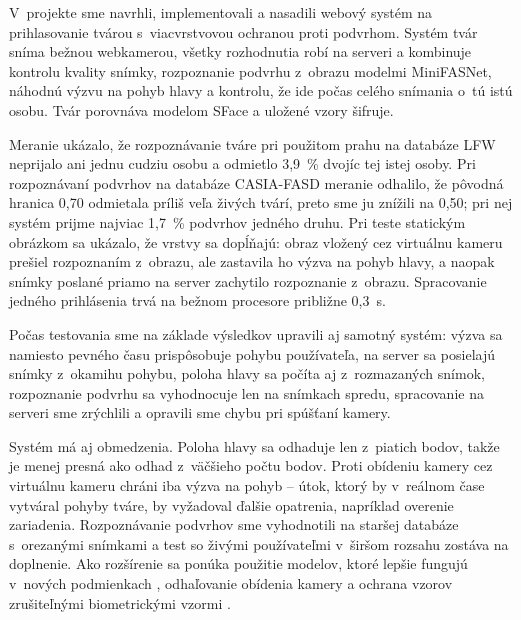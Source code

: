 \documentclass[12pt,a4paper,oneside]{report}
\begin{document}
V~projekte sme navrhli, implementovali a nasadili webový systém na prihlasovanie tvárou
s~viacvrstvovou ochranou proti podvrhom. Systém tvár sníma bežnou webkamerou, všetky
rozhodnutia robí na serveri a kombinuje kontrolu kvality snímky, rozpoznanie podvrhu
z~obrazu modelmi MiniFASNet, náhodnú výzvu na pohyb hlavy a kontrolu, že ide počas
celého snímania o~tú istú osobu. Tvár porovnáva modelom SFace a uložené vzory šifruje.

Meranie ukázalo, že rozpoznávanie tváre pri použitom prahu na databáze LFW neprijalo ani
jednu cudziu osobu a odmietlo 3,9~\% dvojíc tej istej osoby. Pri rozpoznávaní podvrhov
na databáze CASIA-FASD meranie odhalilo, že pôvodná hranica 0,70 odmietala príliš veľa
živých tvárí, preto sme ju znížili na 0,50; pri nej systém prijme najviac 1,7~\% podvrhov
jedného druhu. Pri teste statickým obrázkom sa ukázalo, že vrstvy sa dopĺňajú: obraz
vložený cez virtuálnu kameru prešiel rozpoznaním z~obrazu, ale zastavila ho výzva na
pohyb hlavy, a naopak snímky poslané priamo na server zachytilo rozpoznanie z~obrazu.
Spracovanie jedného prihlásenia trvá na bežnom procesore približne 0,3~s.

Počas testovania sme na základe výsledkov upravili aj samotný systém: výzva sa namiesto
pevného času prispôsobuje pohybu používateľa, na server sa posielajú snímky z~okamihu
pohybu, poloha hlavy sa počíta aj z~rozmazaných snímok, rozpoznanie podvrhu sa
vyhodnocuje len na snímkach spredu, spracovanie na serveri sme zrýchlili a opravili sme
chybu pri spúšťaní kamery.

Systém má aj obmedzenia. Poloha hlavy sa odhaduje len z~piatich bodov, takže je menej
presná ako odhad z~väčšieho počtu bodov. Proti obídeniu kamery cez virtuálnu kameru
chráni iba výzva na pohyb -- útok, ktorý by v~reálnom čase vytváral pohyby tváre, by
vyžadoval ďalšie opatrenia, napríklad overenie zariadenia. Rozpoznávanie podvrhov sme
vyhodnotili na staršej databáze s~orezanými snímkami a test so živými používateľmi
v~širšom rozsahu zostáva na doplnenie. Ako rozšírenie sa ponúka použitie modelov, ktoré
lepšie fungujú v~nových podmienkach \cite{srivatsan2023flip}, odhaľovanie obídenia kamery
a ochrana vzorov zrušiteľnými biometrickými vzormi \cite{abdullahi2024template}.
\end{document}
